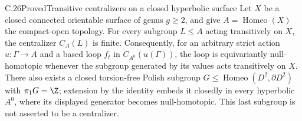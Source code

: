 \begin{claim}{C.26}{Proved}{Transitive centralizers on a closed hyperbolic surface}
Let $X$ be a closed connected orientable surface of genus $g\geq2$,
and give $A=\operatorname{Homeo}(X)$ the compact-open topology.
For every subgroup $L\leq A$ acting transitively on $X$, the centralizer
$C_A(L)$ is finite. Consequently, for an arbitrary strict action
$u:\Gamma\to A$ and a based loop $f_t$ in $C_{A^0}(u(\Gamma))$,
the loop is equivariantly null-homotopic whenever the subgroup generated
by its values acts transitively on $X$.
There also exists a closed torsion-free Polish subgroup
$G\leq\operatorname{Homeo}(D^2,\partial D^2)$ with $\pi_1G=\Z$;
extension by the identity embeds it closedly in every hyperbolic
$A^0$, where its displayed generator becomes null-homotopic. This
last subgroup is not asserted to be a centralizer.
\end{claim}
